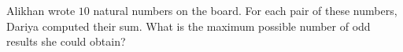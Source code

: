 Alikhan wrote $10$ natural numbers on the board. For each pair of these numbers, Dariya computed their sum. What is the maximum possible number of odd results she could obtain?
